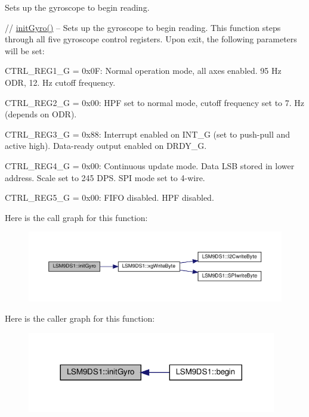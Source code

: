 Sets up the gyroscope to begin reading. 

// \hyperlink{classLSM9DS1_a66a7b02acb28964ffc9362f25988e270}{init\+Gyro()} -- Sets up the gyroscope to begin reading. This function steps through all five gyroscope control registers. Upon exit, the following parameters will be set\+:
\begin{DoxyItemize}
\item C\+T\+R\+L\+\_\+\+R\+E\+G1\+\_\+G = 0x0F\+: Normal operation mode, all axes enabled. 95 Hz O\+DR, 12. Hz cutoff frequency.
\item C\+T\+R\+L\+\_\+\+R\+E\+G2\+\_\+G = 0x00\+: H\+PF set to normal mode, cutoff frequency set to 7. Hz (depends on O\+DR).
\item C\+T\+R\+L\+\_\+\+R\+E\+G3\+\_\+G = 0x88\+: Interrupt enabled on I\+N\+T\+\_\+G (set to push-\/pull and active high). Data-\/ready output enabled on D\+R\+D\+Y\+\_\+G.
\item C\+T\+R\+L\+\_\+\+R\+E\+G4\+\_\+G = 0x00\+: Continuous update mode. Data L\+SB stored in lower address. Scale set to 245 D\+PS. S\+PI mode set to 4-\/wire.
\item C\+T\+R\+L\+\_\+\+R\+E\+G5\+\_\+G = 0x00\+: F\+I\+FO disabled. H\+PF disabled. 
\end{DoxyItemize}Here is the call graph for this function\+:\nopagebreak
\begin{figure}[H]
\begin{center}
\leavevmode
\includegraphics[width=350pt]{classLSM9DS1_a66a7b02acb28964ffc9362f25988e270_cgraph}
\end{center}
\end{figure}
Here is the caller graph for this function\+:\nopagebreak
\begin{figure}[H]
\begin{center}
\leavevmode
\includegraphics[width=308pt]{classLSM9DS1_a66a7b02acb28964ffc9362f25988e270_icgraph}
\end{center}
\end{figure}
\mbox{\label{classLSM9DS1_ae60332c2836bd3f19846b7a44c015ddd}} 

